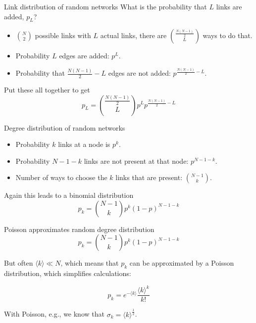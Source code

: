 \documentclass[notes]{beamer}
\begin{document}
\begin{frame}{Link distribution of random networks}
  What is the probability that $L$ links are added, $p_L$? \\[1em]
  \begin{itemize}
    \item ${N \choose 2}$ possible links with $L$ actual links, there are
      ${\frac{N(N-1)}{2} \choose L}$ ways to do that.
    \item Probability $L$ edges are added: $p^L$.
    \item Probability that $\frac{N(N-1)}{2} - L$ edges are not added:
      $p^{\frac{N(N-1)}{2} - L}$.
  \end{itemize}
  Put these all together to get
  \[ p_L = {\frac{N(N-1)}{2} \choose L} p^L p^{\frac{N(N-1)}{2} - L} \]
\end{frame}

\begin{frame}{Degree distribution of random networks}
  \begin{itemize}
    \item Probability $k$ links at a node is $p^k$.
    \item Probability $N-1-k$ links are not present at that node: $p^{N-1-k}$.
    \item Number of ways to choose the $k$ links that are present:
      ${N-1 \choose k}$.
  \end{itemize}
  Again this leads to a binomial distribution
  \[
    p_k = {N-1 \choose k} p^k (1-p)^{N-1-k}
  \]
\end{frame}

\begin{frame}{Poisson approximates random degree distribution}
  \[
    p_k = {N-1 \choose k} p^k (1-p)^{N-1-k}
  \]

  But often $\langle k \rangle \ll N$, which means that $p_k$ can be 
  approximated by a Poisson distribution, which simplifies calculations:

  \[
    p_k = e^{-\langle k \rangle} \frac{\langle k \rangle^k}{k!}
  \]

  With Poisson, e.g., we know that $\sigma_k = \langle k \rangle^{\frac{1}{2}}$.
\end{frame}
\end{document}
